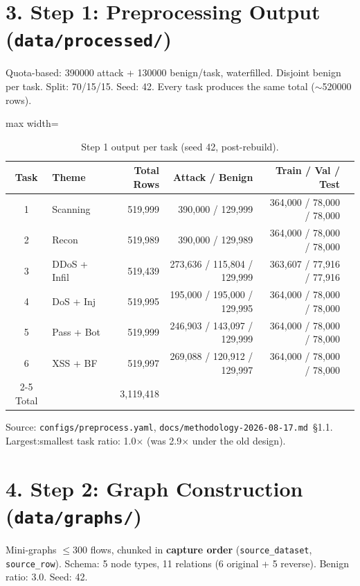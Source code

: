 \documentclass[11pt,a4paper]{article}
\begin{document}
\section*{3. Step 1: Preprocessing Output (\texttt{data/processed/})}
Quota-based: \num{390000} attack + \num{130000} benign/task, waterfilled. Disjoint benign per task. Split: 70/15/15. Seed: \num{42}. Every task produces the same total ($\sim$\num{520000} rows).

\begin{table}[H]
\centering
\caption{Step 1 output per task (seed 42, post-rebuild).}
\label{tab:step1-output}
\begin{adjustbox}{max width=\textwidth}
\begin{tabular}{clrrrr}
\toprule
Task & Theme & Total Rows & Attack / Benign & Train / Val / Test \\
\midrule
1 & Scanning & 519,999 & 390,000 / 129,999 & 364,000 / 78,000 / 78,000 \\
2 & Recon & 519,989 & 390,000 / 129,989 & 364,000 / 78,000 / 78,000 \\
3 & DDoS + Infil & 519,439 & 273,636 / 115,804 / 129,999 & 363,607 / 77,916 / 77,916 \\
4 & DoS + Inj & 519,995 & 195,000 / 195,000 / 129,995 & 364,000 / 78,000 / 78,000 \\
5 & Pass + Bot & 519,999 & 246,903 / 143,097 / 129,999 & 364,000 / 78,000 / 78,000 \\
6 & XSS + BF & 519,997 & 269,088 / 120,912 / 129,997 & 364,000 / 78,000 / 78,000 \\
\cmidrule{2-5}
Total & & 3,119,418 & & \\
\bottomrule
\end{tabular}
\end{adjustbox}
\end{table}

Source: \texttt{configs/preprocess.yaml}, \texttt{docs/methodology-2026-08-17.md}~\S1.1. Largest:smallest task ratio: \num{1.0}$\times$ (was \num{2.9}$\times$ under the old design).

\section*{4. Step 2: Graph Construction (\texttt{data/graphs/})}
Mini-graphs $\le$300 flows, chunked in \textbf{capture order} (\texttt{source\_dataset}, \texttt{source\_row}). Schema: 5 node types, 11 relations (6 original + 5 reverse). Benign ratio: 3.0. Seed: \num{42}.
\end{document}
